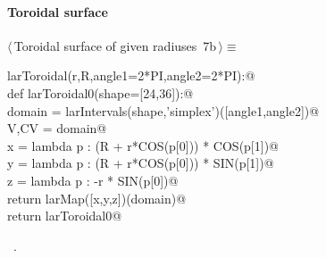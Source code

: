\documentclass[11pt,oneside]{article}	%
\begin{document}
\paragraph{Toroidal surface}
\begin{flushleft} \small \label{scrap12}
\protect{}$\langle\,$Toroidal surface of given radiuses\nobreak\ {\footnotesize 7b}$\,\rangle\equiv$
\vspace{-1ex}
\begin{list}{}{} \item
\mbox{}\verb@def larToroidal(r,R,angle1=2*PI,angle2=2*PI):@\\
\mbox{}\verb@   def larToroidal0(shape=[24,36]):@\\
\mbox{}\verb@      domain = larIntervals(shape,'simplex')([angle1,angle2])@\\
\mbox{}\verb@      V,CV = domain@\\
\mbox{}\verb@      x = lambda p : (R + r*COS(p[0])) * COS(p[1])@\\
\mbox{}\verb@      y = lambda p : (R + r*COS(p[0])) * SIN(p[1])@\\
\mbox{}\verb@      z = lambda p : -r * SIN(p[0])@\\
\mbox{}\verb@      return larMap([x,y,z])(domain)@\\
\mbox{}\verb@   return larToroidal0@\\
\mbox{}\verb@@{\NWsep}
\end{list}
\vspace{-1ex}
\footnotesize\addtolength{\baselineskip}{-1ex}
\begin{list}{}{\setlength{\itemsep}{-\parsep}\setlength{\itemindent}{-\leftmargin}}
\item \NWtxtMacroRefIn\ .
\end{list}
\end{flushleft}
\end{document}
